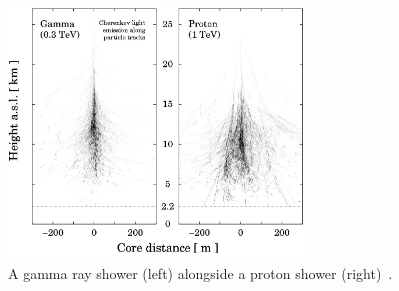   \begin{figure}[!b]
    \centering
    \includegraphics[width=0.7\textwidth]{images/showers_gamma_proton}
    \caption[Gamma Ray and Proton Showers]{
      A gamma ray shower (left) alongside a proton shower (right)~\cite{Bernlohr2008149}.
    }
    \label{fig:gamma_vs_proton_airshower}
  \end{figure}
  
  \FloatBarrier

